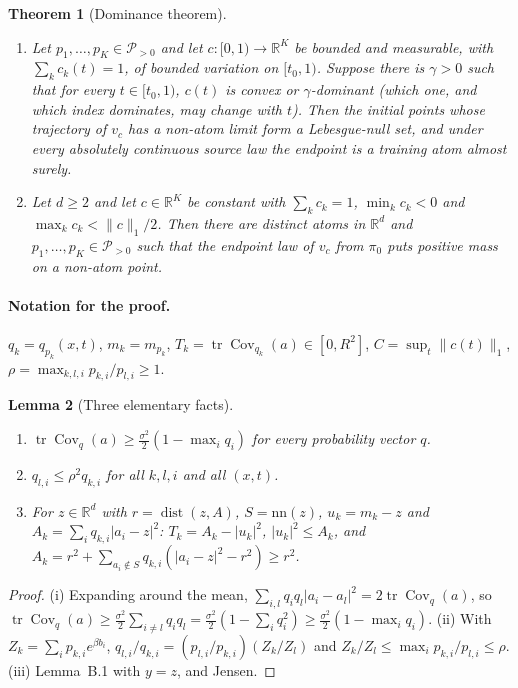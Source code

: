\documentclass[11pt]{article}
\newtheorem{theorem}{Theorem}
\newtheorem{lemma}[theorem]{Lemma}
\theoremstyle{definition}
\theoremstyle{remark}
\newcommand{\R}{\mathbb R}
\newcommand{\Ppos}{\mathcal P_{>0}}
\newcommand{\nn}{\mathrm{nn}}
\DeclareMathOperator{\tr}{tr}
\DeclareMathOperator{\Cov}{Cov}
\DeclareMathOperator{\dist}{dist}
\begin{document}
\begin{theorem}[Dominance theorem]\label{thm:dominance}
\begin{enumerate}[label=(\Alph*),leftmargin=2em]
\item Let $p_1,\dots,p_K\in\Ppos$ and let $c:[0,1)\to\R^K$ be bounded and measurable, with
  $\sum_kc_k(t)=1$, of bounded variation on $[t_0,1)$. Suppose there is $\gamma>0$ such that for
  every $t\in[t_0,1)$, $c(t)$ is convex or $\gamma$-dominant (which one, and which index dominates,
  may change with $t$). Then the initial points whose trajectory of $v_c$ has a non-atom limit
  form a Lebesgue-null set, and under every absolutely continuous source law the endpoint is a
  training atom almost surely.
\item Let $d\ge2$ and let $c\in\R^K$ be constant with $\sum_kc_k=1$, $\min_kc_k<0$ and
  $\max_kc_k<\|c\|_1/2$. Then there are distinct atoms in $\R^d$ and $p_1,\dots,p_K\in\Ppos$ such
  that the endpoint law of $v_c$ from $\pi_0$ puts positive mass on a non-atom point.
\end{enumerate}
\end{theorem}

\paragraph{Notation for the proof.} $q_k=q_{p_k}(x,t)$, $m_k=m_{p_k}$, $T_k=\tr\Cov_{q_k}(a)\in[0,R^2]$,
$C=\sup_t\|c(t)\|_1$, $\rho=\max_{k,l,i}p_{k,i}/p_{l,i}\ge1$.

\begin{lemma}[Three elementary facts]\label{lem:t1facts}
\begin{enumerate}[label=(\roman*),leftmargin=2em]
\item $\tr\Cov_q(a)\ge\frac{\sigma^2}2(1-\max_iq_i)$ for every probability vector $q$.
\item $q_{l,i}\le\rho^2q_{k,i}$ for all $k,l,i$ and all $(x,t)$.
\item For $z\in\R^d$ with $r=\dist(z,A)$, $S=\nn(z)$, $u_k=m_k-z$ and
  $A_k=\sum_iq_{k,i}|a_i-z|^2$: $T_k=A_k-|u_k|^2$, $|u_k|^2\le A_k$, and
  $A_k=r^2+\sum_{a_i\notin S}q_{k,i}(|a_i-z|^2-r^2)\ge r^2$.
\end{enumerate}
\end{lemma}
\begin{proof}
(i) Expanding around the mean, $\sum_{i,l}q_iq_l|a_i-a_l|^2=2\tr\Cov_q(a)$, so
$\tr\Cov_q(a)\ge\frac{\sigma^2}2\sum_{i\ne l}q_iq_l=\frac{\sigma^2}2(1-\sum_iq_i^2)\ge\frac{\sigma^2}2(1-\max_iq_i)$.
(ii) With $Z_k=\sum_ip_{k,i}e^{\beta b_i}$, $q_{l,i}/q_{k,i}=(p_{l,i}/p_{k,i})(Z_k/Z_l)$ and
$Z_k/Z_l\le\max_ip_{k,i}/p_{l,i}\le\rho$. (iii) Lemma~B.1 with $y=z$, and Jensen.
\end{proof}
\end{document}
